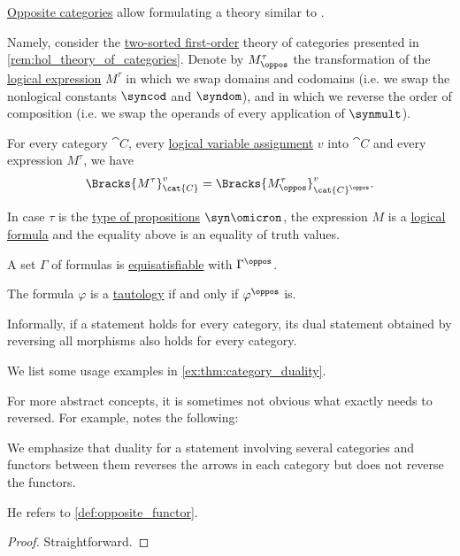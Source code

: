 \begin{theorem}\label{thm:category_duality}
  \hyperref[def:opposite_category]{Opposite categories} allow formulating a theory similar to .

  Namely, consider the \hyperref[def:many_sorted_fol]{two-sorted first-order} theory of categories presented in \cref{rem:hol_theory_of_categories}. Denote by \( M^\tau_\oppos \) the transformation of the \hyperref[def:hol_expression]{logical expression} \( M^\tau \) in which we swap domains and codomains (i.e. we swap the nonlogical constants \( \syncod \) and \( \syndom \)), and in which we reverse the order of composition (i.e. we swap the operands of every application of \( \synmult \)).

  \begin{thmenum}
     For every category \( \cat{C} \), every \hyperref[def:hol_variable_assignment]{logical variable assignment} \( v \) into \( \cat{C} \) and every expression \( M^\tau \), we have
    \begin{equation*}
      \Bracks{M^\tau}_{\cat{C}}^v = \Bracks{M^\tau_\oppos}_{\cat{C}^\oppos}^v.
    \end{equation*}

    In case \( \tau \) is the \hyperref[def:quantifiable_type]{type of propositions} \( \syn\omicron \), the expression \( M \) is a \hyperref[def:hol_expression/formula]{logical formula} and the equality above is an equality of truth values.

     A set \( \Gamma \) of formulas is \hyperref[def:equisatisfiability]{equisatisfiable} with \( \Gamma^\oppos \).

     The formula \( \varphi \) is a \hyperref[def:hol_semantics/tautology]{tautology} if and only if \( \varphi^\oppos \) is.

    Informally, if a statement holds for every category, its dual statement obtained by reversing all morphisms also holds for every category.
  \end{thmenum}
\end{theorem}
\begin{comments}
  \item We list some usage examples in \cref{ex:thm:category_duality}.
  \item For more abstract concepts, it is sometimes not obvious what exactly needs to reversed. For example, \textcite[32]{MacLane1998CategoryTheory} notes the following:
  \begin{displayquote}
    We emphasize that duality for a statement involving several categories and functors between them reverses the arrows in each category but does not reverse the functors.
  \end{displayquote}

  He refers to \cref{def:opposite_functor}.
\end{comments}
\begin{proof}
  Straightforward.
\end{proof}

